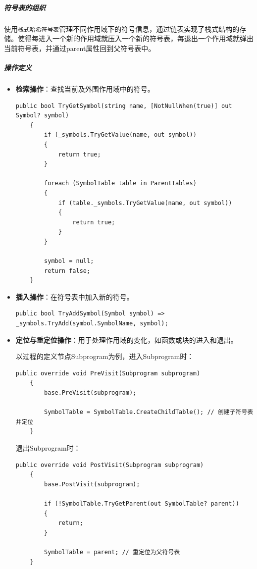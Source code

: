\documentclass[../main.tex]{subfiles}
\begin{document}
\subparagraph{符号表的组织}
使用\texttt{栈式哈希符号表}管理不同作用域下的符号信息，通过链表实现了栈式结构的存储。使得每进入一个新的作用域就压入一个新的符号表，每退出一个作用域就弹出当前符号表，并通过parent属性回到父符号表中。

\subparagraph{操作定义}
\begin{itemize}
    \item \textbf{检索操作}：查找当前及外围作用域中的符号。

    \begin{lstlisting}[style = csharp]
        public bool TryGetSymbol(string name, [NotNullWhen(true)] out Symbol? symbol)
    {
        if (_symbols.TryGetValue(name, out symbol))
        {
            return true;
        }

        foreach (SymbolTable table in ParentTables)
        {
            if (table._symbols.TryGetValue(name, out symbol))
            {
                return true;
            }
        }

        symbol = null;
        return false;
    }
    \end{lstlisting}
    
    \item \textbf{插入操作}：在符号表中加入新的符号。

    \begin{lstlisting}[style = csharp]
        public bool TryAddSymbol(Symbol symbol) => _symbols.TryAdd(symbol.SymbolName, symbol);
    \end{lstlisting}
    
    \item \textbf{定位与重定位操作}：用于处理作用域的变化，如函数或块的进入和退出。

    以过程的定义节点Subprogram为例，进入Subprogram时：
    \begin{lstlisting}[style = csharp]
        public override void PreVisit(Subprogram subprogram)
    {
        base.PreVisit(subprogram);

        SymbolTable = SymbolTable.CreateChildTable(); // 创建子符号表并定位
    }
    \end{lstlisting}

    退出Subprogram时：
    \begin{lstlisting}[style = csharp]
        public override void PostVisit(Subprogram subprogram)
    {
        base.PostVisit(subprogram);

        if (!SymbolTable.TryGetParent(out SymbolTable? parent))
        {
            return;
        }

        SymbolTable = parent; // 重定位为父符号表
    }
    \end{lstlisting}
    
\end{itemize}
\end{document}
